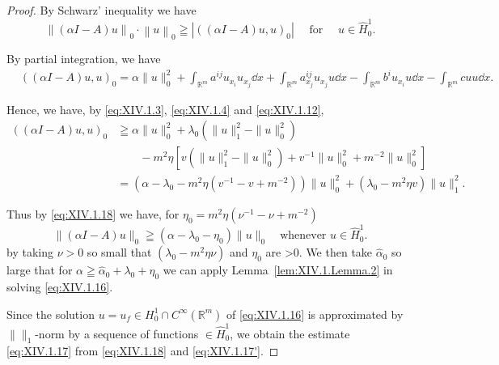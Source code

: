 \begin{proof}
 By Schwarz' inequality we have 
\begin{equation}\label{eq:XIV.1.18}
\left\| (\alpha I - A) u \right\| _{0} \cdot \left\| u \right\| _{0} \geqq \left| \left((\alpha I - A) u, u\right) _{0} \right| \quad \text{ for } \quad u \in \hat {H} _{0} ^{1}. \end{equation}

By partial integration, we have 
\[
\begin{aligned}
&\left((\alpha I - A) u, u\right) _{0} = \alpha \| u \| _{0} ^{2} + \int_ {\mathbb{R}^{m}} a ^{ij} u _ {x _{i}} u _ {x _{j}} \dd x + \int_ {\mathbb{R}^{m}} a _ {x _{j}} ^{ij} u _ {x _{j}} u \dd x - \int_ {\mathbb{R}^{m}} b ^{i} u _ {x _{i}} u \dd x - \int_ {\mathbb{R}^{m}} c u u \dd x.
\end{aligned}
\]

Hence, we have, by \eqref{eq:XIV.1.3}, \eqref{eq:XIV.1.4} and \eqref{eq:XIV.1.12}, 
\[
\begin{aligned}
((\alpha I - A) u, u) _{0}& \geqq \alpha \| u \| _{0} ^{2} + \lambda_{0} (\| u \| _{1} ^{2} - \| u \| _{0} ^{2})
\\
&\quad \quad - m ^{2} \eta [ v (\| u \| _{1} ^{2} - \| u \| _{0} ^{2}) + v ^{-1} \| u \| _{0} ^{2} + m ^{-2} \| u \| _{0} ^{2} ]
\\
&= (\alpha - \lambda_{0} - m ^{2} \eta (v ^{-1} - v + m ^{-2})) \| u \| _{0} ^{2} + (\lambda_{0} - m ^{2} \eta v) \| u \| _{1} ^{2}.
\end{aligned}
\]

Thus by \eqref{eq:XIV.1.18} we have, for $\eta_0 = m^2\eta (\nu^{-1} - \nu +m^{-2})$ 
\begin{equation}\tag{17'}\label{eq:XIV.1.17'}
\|(\alpha I-A)u\|_{0}\geqq(\alpha-\lambda_{0}-\eta_{0})\|u\|_{0}\quad\text{whenever }u\in\hat{H}_{0}^{1}.
\end{equation}
by taking $\nu>0$ so small that $(\lambda_{0}-m^{2}\eta\nu)$ and $\eta_{0}$ are >$0$. We then take $\hat{\alpha}_{0}$ so large that for $\alpha\geqq\hat{\alpha}_{0}+\lambda_{0}+\eta_{0}$ we can apply Lemma~\ref{lem:XIV.1.Lemma.2} in solving \eqref{eq:XIV.1.16}. 

Since the solution $u = u_f \in H_0^1 \cap C^\infty(\mathbb{R}^{m})$ of \eqref{eq:XIV.1.16} is approximated by $\|\|_1$-norm by a sequence of functions $\in \hat{H}_0^1$, we obtain the estimate \eqref{eq:XIV.1.17} from \eqref{eq:XIV.1.18} and \eqref{eq:XIV.1.17'}. 
\end{proof}

